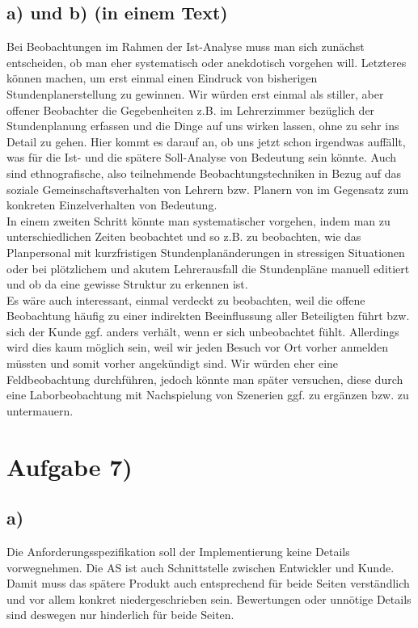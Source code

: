 \documentclass{swp1}
\begin{document}
\subsection*{a) und b) (in einem Text)}
Bei Beobachtungen im Rahmen der Ist-Analyse muss man sich zunächst entscheiden, ob man eher systematisch oder anekdotisch vorgehen will. Letzteres können machen, um erst einmal einen Eindruck von bisherigen Stundenplanerstellung zu gewinnen. Wir würden erst einmal als stiller, aber offener Beobachter die Gegebenheiten z.B. im Lehrerzimmer bezüglich der Stundenplanung erfassen und die Dinge auf uns wirken lassen, ohne zu sehr ins Detail zu gehen. Hier kommt es darauf an, ob uns jetzt schon irgendwas auffällt, was für die Ist- und die spätere Soll-Analyse von Bedeutung sein könnte. Auch sind ethnografische, also teilnehmende Beobachtungstechniken in Bezug auf das soziale Gemeinschaftsverhalten von Lehrern bzw. Planern von im Gegensatz zum konkreten Einzelverhalten von Bedeutung.\\
In einem zweiten Schritt könnte man systematischer vorgehen, indem man zu unterschiedlichen Zeiten beobachtet und so z.B. zu beobachten, wie das Planpersonal mit kurzfristigen Stundenplanänderungen in stressigen Situationen oder bei plötzlichem und akutem Lehrerausfall die Stundenpläne manuell editiert und ob da eine gewisse Struktur zu erkennen ist. \\
Es wäre auch interessant, einmal verdeckt zu beobachten, weil die offene Beobachtung häufig zu einer indirekten Beeinflussung aller Beteiligten führt bzw. sich der Kunde ggf. anders verhält, wenn er sich unbeobachtet fühlt. Allerdings wird dies kaum möglich sein, weil wir jeden Besuch vor Ort vorher anmelden müssten und somit vorher angekündigt sind. Wir würden eher eine Feldbeobachtung durchführen, jedoch könnte man später versuchen, diese durch eine Laborbeobachtung mit Nachspielung von Szenerien ggf. zu ergänzen bzw. zu untermauern.

\section*{Aufgabe 7)}
\subsection*{a)}
Die Anforderungsspezifikation soll der Implementierung keine Details vorwegnehmen. Die AS ist auch Schnittstelle zwischen Entwickler und Kunde. Damit muss das spätere Produkt auch entsprechend für beide Seiten verständlich und vor allem konkret niedergeschrieben sein. Bewertungen oder unnötige Details sind deswegen nur hinderlich für beide Seiten.\\
\end{document}
